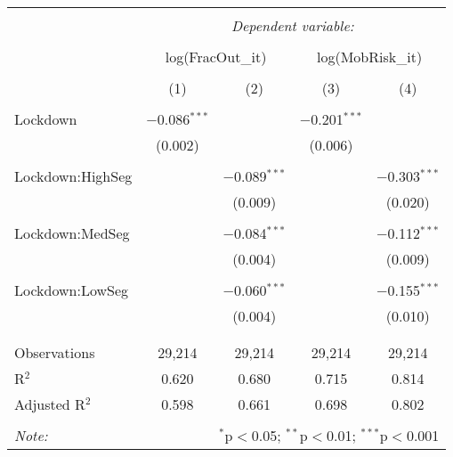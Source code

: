 \begin{tabular}{@{\extracolsep{5pt}}lcccc} 
\\[-1.8ex]\hline 
\hline \\[-1.8ex] 
 & \multicolumn{4}{c}{\textit{Dependent variable:}} \\ 
\cline{2-5} 
\\[-1.8ex] & \multicolumn{2}{c}{log(FracOut_{it})} & \multicolumn{2}{c}{log(MobRisk_{it})} \\ 
\\[-1.8ex] & (1) & (2) & (3) & (4)\\ 
\hline \\[-1.8ex] 
 Lockdown & $-$0.086$^{***}$ &  & $-$0.201$^{***}$ &  \\ 
  & (0.002) &  & (0.006) &  \\ 
  & & & & \\ 
 Lockdown:HighSeg &  & $-$0.089$^{***}$ &  & $-$0.303$^{***}$ \\ 
  &  & (0.009) &  & (0.020) \\ 
  & & & & \\ 
 Lockdown:MedSeg &  & $-$0.084$^{***}$ &  & $-$0.112$^{***}$ \\ 
  &  & (0.004) &  & (0.009) \\ 
  & & & & \\ 
 Lockdown:LowSeg &  & $-$0.060$^{***}$ &  & $-$0.155$^{***}$ \\ 
  &  & (0.004) &  & (0.010) \\ 
  & & & & \\ 
\hline \\[-1.8ex] 
Observations & 29,214 & 29,214 & 29,214 & 29,214 \\ 
R$^{2}$ & 0.620 & 0.680 & 0.715 & 0.814 \\ 
Adjusted R$^{2}$ & 0.598 & 0.661 & 0.698 & 0.802 \\ 
\hline 
\hline \\[-1.8ex] 
\textit{Note:}  & \multicolumn{4}{r}{$^{*}$p$<$0.05; $^{**}$p$<$0.01; $^{***}$p$<$0.001} \\ 
\end{tabular} 